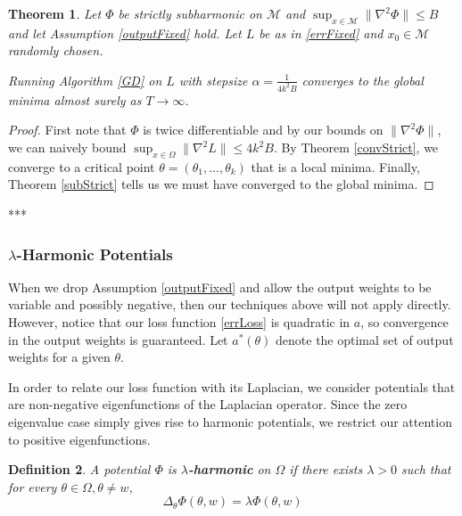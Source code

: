 \documentclass{article}
\newtheorem{theorem}{Theorem}[section]
\newtheorem{definition}[theorem]{Definition}
\begin{document}
\begin{theorem}
Let $\Phi$ be strictly subharmonic on $\mathcal{M}$ and $\sup_{x \in \mathcal{M}} \|\nabla^2 \Phi\|\leq B$ and let Assumption \ref{outputFixed} hold. Let $L$ be as in \eqref{errFixed} and $x_0 \in \mathcal{M}$ randomly chosen. 

Running Algorithm \ref{GD} on $L$ with stepsize $\alpha = \frac{1}{4k^2B}$ converges to the global minima almost surely as $T\to\infty$.
\end{theorem}

\begin{proof}
First note that $\Phi$ is twice differentiable and by our bounds on $\|\nabla^2\Phi\|$, we can naively bound $\sup_{x\in\Omega}\|\nabla^2L\|\leq 4k^2B$. By Theorem \ref{convStrict}, we converge to a critical point $\theta = (\theta_1,...,\theta_k)$ that is a local minima. Finally, Theorem \ref{subStrict} tells us we must have converged to the global minima.
\end{proof}


***



\subsubsection{$\lambda$-Harmonic Potentials}

When we drop Assumption \ref{outputFixed} and allow the output weights to be variable and possibly negative, then our techniques above will not apply directly. However, notice that our loss function \eqref{errLoss} is quadratic in $a$, so convergence in the output weights is guaranteed. Let $a^*(\theta)$ denote the optimal set of output weights for a given $\theta$. 

In order to relate our loss function with its Laplacian, we consider potentials that are non-negative eigenfunctions of the Laplacian operator. Since the zero eigenvalue case simply gives rise to harmonic potentials, we restrict our attention to positive eigenfunctions.

\begin{definition}
A potential $\Phi$ is {\bf$\lambda$-harmonic} on $\Omega$ if there exists $\lambda > 0$ such that for every $\theta \in \Omega, \theta \neq w$,
\[\Delta_\theta \Phi(\theta, w) = \lambda \Phi(\theta,w) \]
\end{definition}
\end{document}
